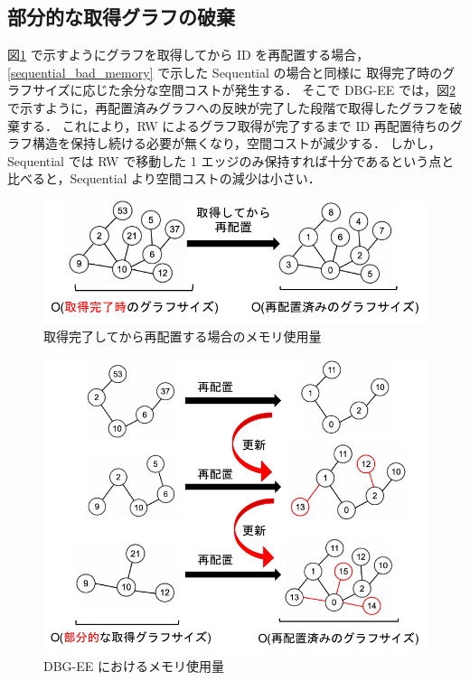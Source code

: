 \subsection{部分的な取得グラフの破棄}
図\ref{dbg-ee_bad_memory} で示すようにグラフを取得してから ID を再配置する場合，\ref{sequential_bad_memory} で示した Sequential の場合と同様に
取得完了時のグラフサイズに応じた余分な空間コストが発生する．
そこで DBG-EE では，図\ref{dbg-ee_good_memory} で示すように，再配置済みグラフへの反映が完了した段階で取得したグラフを破棄する．
これにより，RW によるグラフ取得が完了するまで ID 再配置待ちのグラフ構造を保持し続ける必要が無くなり，空間コストが減少する．
しかし，Sequential では RW で移動した 1 エッジのみ保持すれば十分であるという点と比べると，Sequential より空間コストの減少は小さい．
\begin{figure}[t]
  \centering
  \includegraphics[width=\linewidth]{./figure/dbg-ee_bad_memory.pdf}
  \caption{取得完了してから再配置する場合のメモリ使用量}
  \label{dbg-ee_bad_memory}
\end{figure}
\begin{figure}[t]
  \centering
  \includegraphics[width=\linewidth]{./figure/dbg-ee_good_memory.pdf}
  \caption{DBG-EE におけるメモリ使用量}
  \label{dbg-ee_good_memory}
\end{figure}

